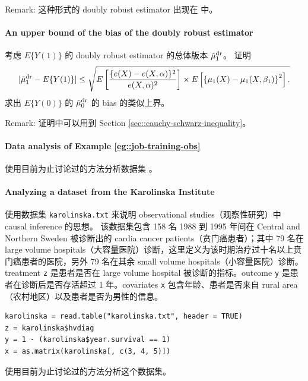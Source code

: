 Remark:
这种形式的 doubly robust estimator 出现在 \citet{robins2007comment} 中。



\paragraph{An upper bound of the bias of the doubly robust estimator}\label{hw::upperbound-dr}


考虑 $E\{  Y(1) \} $ 的 doubly robust estimator 的总体版本 $\tilde{\mu}_1^\textup{dr} $。
证明
$$
 |   \tilde{\mu}_1^\textup{dr} - E\{  Y(1) \}  |  \leq
\sqrt{
E\left[   \frac{ \{  e(X) - e(X,\alpha)\}^2  }{  e(X,\alpha)^2 }  \right] \times 
E\left[  \left\{  \mu_1(X) -  \mu_1(X, \beta_1)   \right\}^2 \right] .
}
$$
求出 $E\{  Y(0) \} $ 的 $\tilde{\mu}_0^\textup{dr} $ 的 bias 的类似上界。


Remark: 证明中可以用到 Section \ref{sec::cauchy-schwarz-inequality}。


\paragraph{Data analysis of Example \ref{eg::job-training-obs}}


使用目前为止讨论过的方法分析数据集 。

 
 
\paragraph{Analyzing a dataset from the Karolinska Institute}\label{hw::Karolinska-dr}
 
 \citet{rubin2008objective} 使用数据集 \texttt{karolinska.txt} 来说明 observational studies（观察性研究）中 causal inference 的思想。
 该数据集包含 158 名 1988 到 1995 年间在 Central and Northern Sweden 被诊断出的 cardia cancer patients（贲门癌患者）；其中 79 名在 large volume hospitals（大容量医院）诊断，这里定义为该时期治疗过十名以上贲门癌患者的医院，另外 79 名在其余 small volume hospitals（小容量医院）诊断。treatment \texttt{z} 是患者是否在 large volume hospital 被诊断的指标。outcome \texttt{y} 是患者在诊断后是否存活超过 1 年。covariates \texttt{x} 包含年龄、患者是否来自 rural area（农村地区）以及患者是否为男性的信息。
 
\begin{lstlisting}
karolinska = read.table("karolinska.txt", header = TRUE)
z = karolinska$hvdiag
y = 1 - (karolinska$year.survival == 1)
x = as.matrix(karolinska[, c(3, 4, 5)])
\end{lstlisting}


使用目前为止讨论过的方法分析这个数据集。



  
 
